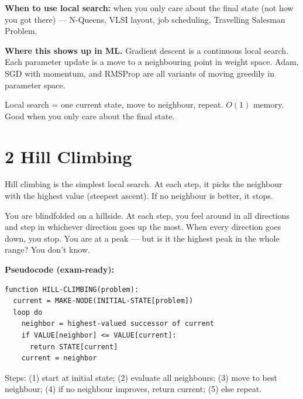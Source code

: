 \documentclass[a4paper,11pt]{article}
\begin{document}
\textbf{When to use local search:} when you only care about the final state (not how you got there) — N-Queens, VLSI layout, job scheduling, Travelling Salesman Problem.

\textbf{Where this shows up in ML.} Gradient descent is a continuous local search. Each parameter update is a move to a neighbouring point in weight space. Adam, SGD with momentum, and RMSProp are all variants of moving greedily in parameter space.

\begin{keytake}
Local search = one current state, move to neighbour, repeat. $O(1)$ memory. Good when you only care about the final state.
\end{keytake}

\section{2 \quad Hill Climbing}

Hill climbing is the simplest local search. At each step, it picks the neighbour with the highest value (steepest ascent). If no neighbour is better, it stops.

\begin{intuition}
You are blindfolded on a hillside. At each step, you feel around in all directions and step in whichever direction goes up the most. When every direction goes down, you stop. You are at a peak — but is it the highest peak in the whole range? You don't know.
\end{intuition}

\textbf{Pseudocode (exam-ready):}
\begin{verbatim}
function HILL-CLIMBING(problem):
  current = MAKE-NODE(INITIAL-STATE[problem])
  loop do
    neighbor = highest-valued successor of current
    if VALUE[neighbor] <= VALUE[current]:
      return STATE[current]
    current = neighbor
\end{verbatim}

Steps: (1) start at initial state; (2) evaluate all neighbours; (3) move to best neighbour; (4) if no neighbour improves, return current; (5) else repeat.
\end{document}
